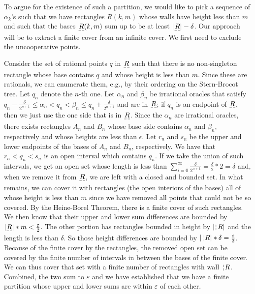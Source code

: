 \documentclass[12pt]{article}
\begin{document}
To argue for the existence of such a partition, we would like to pick a sequence of $\alpha_k$'s such that we have rectangles $R(k, m)$  whose walls have height less than $m$ and such that the bases $\base{R} (k, m)$ sum up to be at least $|\base{R}|-\delta$. Our approach will be to extract a finite cover from an infinite cover. We first need to exclude the uncooperative points. 

Consider the set of rational points $q$ in $\base{R}$ such that there is no non-singleton rectangle whose base contains $q$ and whose height is less than $m$. Since these are rationals, we can enumerate them, e.g.,  by their ordering on the Stern-Brocot tree. Let $q_n$ denote the $n$-th one. Let $\alpha_n$ and $\beta_n$ be irrational oracles that satisfy $q_n - \frac{\delta}{2^{n+1}} \leq \alpha_n < q_n < \beta_n \leq q_n + \frac{\delta}{2^{n+1}}$ and are in $\base{R}$; if $q_n$ is an endpoint of $\base{R}$, then we just use the one side that is in $\base{R}$. Since the $\alpha_n$ are irrational oracles, there exists rectangles $A_n$ and $B_n$ whose base side contains $\alpha_n$ and $\beta_n$, respectively and whose heights are less than $\epsilon$. Let $r_n$ and $s_n$ be the upper and lower endpoints of the bases of $A_n$ and $B_n$, respectively. We have that $r_n < q_n < s_n$ is an open interval which contains $q_n$. If we take the union of such intervals, we get an open set whose length is less than $\sum_{i=0}^\infty \frac{\delta}{2^{n+1}} = \frac{\delta}{2} * 2 = \delta$ and, when we remove it from $\base{R}$, we are left with a closed and bounded set. In what remains, we can cover it with rectangles (the open interiors of the bases) all of whose height is less than $m$ since we have removed all points that could not be so covered. By the Heine-Borel Theorem, there is a finite cover of such rectangles. We then know that their upper and lower sum differences are bounded by $|\base{R}|*m < \frac{\varepsilon}{2}$. The other portion has rectangles bounded in height by $|\wall{R}|$ and the length is less than $\delta$. So those height differences are bounded by $|\wall{R}|*\delta = \frac{\varepsilon}{2}$. Because of the finite cover by the rectangles, the removed open set can be covered by the finite number of intervals in between the bases of the finite cover. We can thus cover that set with a finite number of rectangles with wall $\wall{R}$. Combined, the two sum to $\varepsilon$ and we have established that we have a finite partition whose upper and lower sums are within $\varepsilon$ of each other. 
\end{document}
